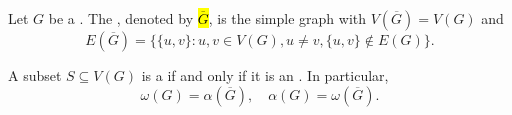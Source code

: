 \begin{proposition} \label{proposition:complement_of_a_graph_clique_and_independent_set_relationship}
Let $G$ be a . The , denoted by \hl{$\overline{G}$}, is the simple graph with $V(\overline{G}) = V(G)$ and
$$E(\overline{G}) = \{\{u,v\} : u,v \in V(G), u \neq v, \{u,v\} \notin E(G)\}.$$

A subset $S \subseteq V(G)$ is a  if and only if it is an . In particular,
$$\omega(G) = \alpha(\overline{G}), \quad \alpha(G) = \omega(\overline{G}).$$
\end{proposition}
